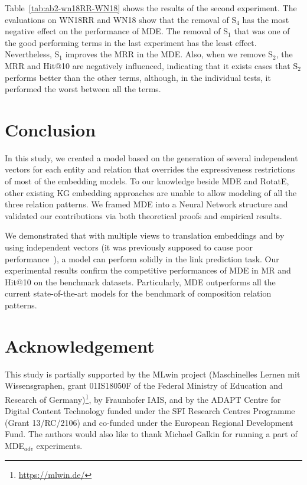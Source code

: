 \documentclass{ecai}
\begin{document}
Table~\ref{tab:ab2-wn18RR-WN18} shows the results of the second experiment. The evaluations on WN18RR and WN18 show that the removal of S$_4$ has the most negative effect on the performance of MDE. The removal of S$_1$ that was one of the good performing terms in the last experiment has the least effect. Nevertheless, S$_1$ improves the MRR in the MDE. Also, when we remove S$_2$, the MRR and Hit@10 are negatively influenced, indicating that it exists cases that S$_2$ performs better than the other terms, although, in the individual tests, it performed the worst between all the terms.




\section{Conclusion}

In this study, we created a model based on the generation of several independent vectors for each entity and relation that overrides the expressiveness restrictions of most of the embedding models.
To our knowledge beside MDE and RotatE, other existing KG embedding approaches are unable to allow modeling of all the three relation patterns.
We framed MDE into a Neural Network structure and validated our contributions via both theoretical proofs and empirical results.

We demonstrated that with multiple views to translation embeddings and by using independent vectors (it was previously supposed to cause poor performance~\cite{trouillon2017knowledge,kazemi2018simple}), a model can perform solidly in the link prediction task.
Our experimental results confirm the competitive performances of MDE in MR and Hit@10 on the benchmark datasets. Particularly, MDE outperforms all the current state-of-the-art models for the benchmark of composition relation patterns. 

\clearpage 

\section*{Acknowledgement}
This study is partially supported by the MLwin project (Maschinelles Lernen mit Wissensgraphen, grant 01IS18050F of the Federal Ministry of Education and Research of Germany)\footnote{\url{https://mlwin.de/}}, by Fraunhofer IAIS, and by the ADAPT Centre for Digital Content Technology funded under the SFI Research Centres Programme (Grant 13/RC/2106) and co-funded under the European Regional Development Fund. The authors would also like to thank Michael Galkin for running a part of MDE$_{adv}$ experiments.



















\newpage
\appendix
\end{document}
